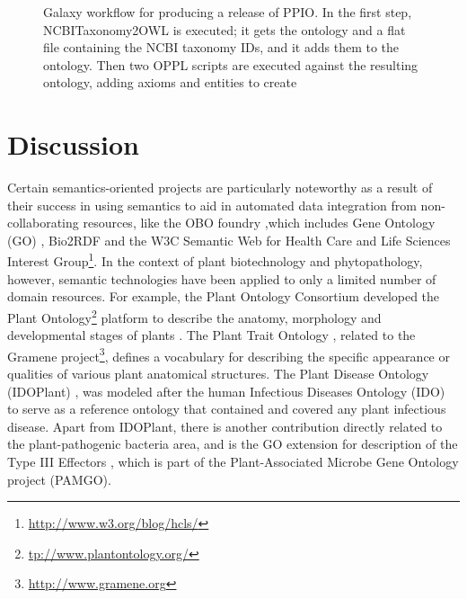 \documentclass[sw]{iosart2c}
\newcommand{\myurl}[1]{\footnote{\url{#1}}}
\begin{document}
\begin{figure*}
\caption{Galaxy workflow for producing a release of PPIO. In the first step, NCBITaxonomy2OWL is executed; it gets the ontology and a flat file containing the NCBI taxonomy IDs, and it adds them to the ontology. Then two OPPL scripts are executed against the resulting ontology, adding axioms and entities to create }\label{fig:galaxy-workflow}
\end{figure*}

\section{Discussion}\label{sec:discussion}

Certain semantics-oriented projects are particularly noteworthy as a result of their success in using semantics to aid in automated data  integration from non-collaborating resources, like the OBO foundry \cite{Smith},which includes Gene Ontology (GO) \cite{Gene}, Bio2RDF \cite{RDF} and the W3C Semantic  Web  for Health  Care  and  Life Sciences Interest Group\myurl{http://www.w3.org/blog/hcls/}. In the context of plant biotechnology and phytopathology, however, semantic technologies have been applied to only a limited number of domain resources. For example, the Plant Ontology Consortium developed the Plant Ontology\myurl{tp://www.plantontology.org/} platform to describe the anatomy, morphology and developmental stages of plants \cite{PO}. The Plant Trait Ontology \cite{PTO}, related to the Gramene project\myurl{http://www.gramene.org}, defines a vocabulary for describing the specific appearance or qualities of various plant anatomical structures. The Plant Disease Ontology (IDOPlant) \cite{Walls}, was modeled after the human Infectious Diseases Ontology (IDO) \cite{IDO} to serve as a reference ontology that contained and covered any plant infectious disease. Apart from IDOPlant, there is another contribution directly related to the plant-pathogenic bacteria area, and is the GO extension for description of the Type III Effectors \cite{Lindeberg}, which is part of the Plant-Associated Microbe Gene Ontology project (PAMGO). 
\end{document}
